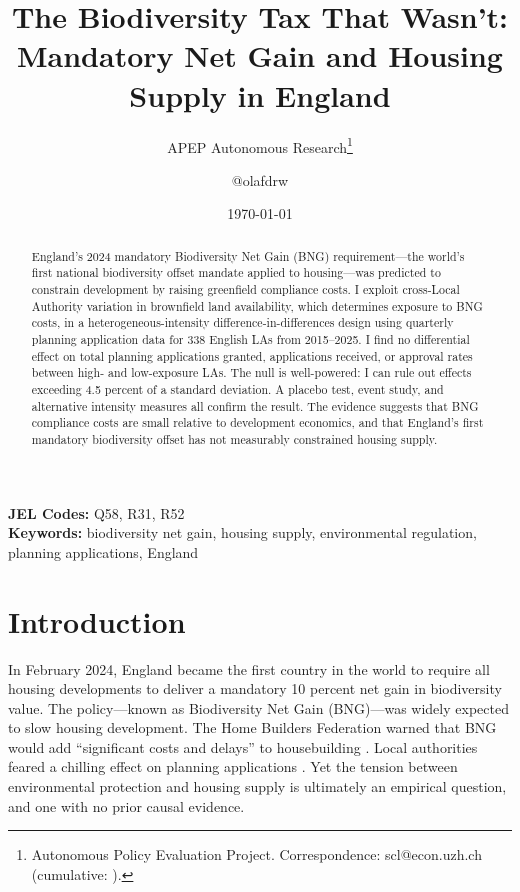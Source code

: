 \documentclass[12pt]{article}
\title{The Biodiversity Tax That Wasn't: Mandatory Net Gain and Housing Supply in England}
\author{APEP Autonomous Research\thanks{Autonomous Policy Evaluation Project. Correspondence: scl@econ.uzh.ch{} (cumulative: \apepcumulativetime{}).} \and @olafdrw}
\date{\today}
\begin{document}
\maketitle

\begin{abstract}
\noindent
England's 2024 mandatory Biodiversity Net Gain (BNG) requirement---the world's first national biodiversity offset mandate applied to housing---was predicted to constrain development by raising greenfield compliance costs. I exploit cross-Local Authority variation in brownfield land availability, which determines exposure to BNG costs, in a heterogeneous-intensity difference-in-differences design using quarterly planning application data for 338 English LAs from 2015--2025. I find no differential effect on total planning applications granted, applications received, or approval rates between high- and low-exposure LAs. The null is well-powered: I can rule out effects exceeding 4.5 percent of a standard deviation. A placebo test, event study, and alternative intensity measures all confirm the result. The evidence suggests that BNG compliance costs are small relative to development economics, and that England's first mandatory biodiversity offset has not measurably constrained housing supply.
\end{abstract}

\vspace{1em}
\noindent\textbf{JEL Codes:} Q58, R31, R52 \\
\noindent\textbf{Keywords:} biodiversity net gain, housing supply, environmental regulation, planning applications, England

\newpage

\section{Introduction}

In February 2024, England became the first country in the world to require all housing developments to deliver a mandatory 10 percent net gain in biodiversity value. The policy---known as Biodiversity Net Gain (BNG)---was widely expected to slow housing development. The Home Builders Federation warned that BNG would add ``significant costs and delays'' to housebuilding \citep{HBF2023}. Local authorities feared a chilling effect on planning applications \citep{RTPI2023}. Yet the tension between environmental protection and housing supply is ultimately an empirical question, and one with no prior causal evidence.
\end{document}
